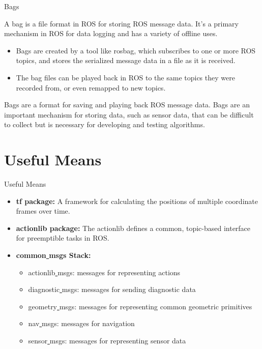 \documentclass{beamer}
\begin{document}
\begin{frame}{Bags}
	\begin{definition}[Bag]
		A bag is a file format in ROS for storing ROS message data. It's a primary mechanism in ROS for data logging and has a variety of offline uses.  
	\end{definition}
	\begin{itemize}
		\item Bags are created by a tool like rosbag, which subscribes to one or more ROS topics, and stores the serialized message data in a file as it is received. 
		\item The bag files can be played back in ROS to the same topics they were recorded from, or even remapped to new topics. 
	\end{itemize}
	Bags are a format for saving and playing back ROS message data. Bags are an important mechanism for storing data, such as sensor data, that can be difficult to collect but is necessary for developing and testing algorithms.	
	
\end{frame}


\section{Useful Means}

\begin{frame}{Useful Means}

	\begin{itemize}
		\item \textbf{tf package:} A framework for calculating the positions of multiple coordinate frames over time. \\
		  
		\item \textbf{actionlib package:} The actionlib defines a common, topic-based interface for preemptible tasks in ROS.
		
		\item \textbf{common\underline{ }msgs Stack:} 
			\begin{itemize}
				\item actionlib\underline{ }msgs: messages for representing actions
				\item diagnostic\underline{ }msgs: messages for sending diagnostic data
				\item geometry\underline{ }msgs: messages for representing common geometric primitives
				\item nav\underline{ }msgs: messages for navigation
				\item sensor\underline{ }msgs: messages for representing sensor data
			\end{itemize}
				
	\end{itemize}

\end{frame}
\end{document}
